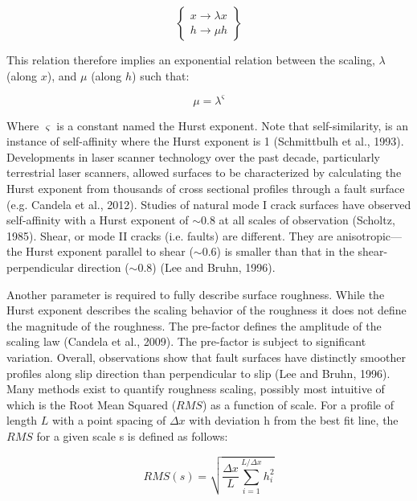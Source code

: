 \documentclass[12pt,a4paper]{article}
\begin{document}
\begin{equation}
\left\lbrace
  \begin{matrix}
   	x \rightarrow \lambda x \\
    h \rightarrow \mu h
  \end{matrix}
\right\rbrace
\end{equation}


This relation therefore implies an exponential relation between the scaling, $\lambda$ (along $x$), and $\mu$ (along $h$) such that:

\begin{equation}
\mu = \lambda^\varsigma
\end{equation}

Where $\varsigma$ is a constant named the Hurst exponent. Note that self-similarity, is an instance of self-affinity where the Hurst exponent is 1 (Schmittbulh et al., 1993). Developments in laser scanner technology over the past decade, particularly terrestrial laser scanners, allowed surfaces to be characterized by calculating the Hurst exponent from thousands of cross sectional profiles through a fault surface (e.g. Candela et al., 2012). Studies of natural mode I crack surfaces have observed self-affinity with a Hurst exponent of $\sim$0.8 at all scales of observation (Scholtz, 1985). Shear, or mode II cracks (i.e. faults) are different. They are anisotropic—the Hurst exponent parallel to shear ($\sim$0.6) is smaller than that in the shear-perpendicular direction ($\sim$0.8) (Lee and Bruhn, 1996). 

Another parameter is required to fully describe surface roughness. While the Hurst exponent describes the scaling behavior of the roughness it does not define the magnitude of the roughness. The pre-factor defines the amplitude of the scaling law (Candela et al., 2009). The pre-factor is subject to significant variation. Overall, observations show that fault surfaces have distinctly smoother profiles along slip direction than perpendicular to slip (Lee and Bruhn, 1996).
Many methods exist to quantify roughness scaling, possibly most intuitive of which is the Root Mean Squared ($RMS$) as a function of scale. For a profile of length $L$ with a point spacing of $\Delta x$ with deviation h from the best fit line, the $RMS$ for a given scale s is defined as follows:

\begin{equation}
RMS(s)=\sqrt{\dfrac{\Delta x}{L}\sum^{L/{\Delta x}}_{i=1} h^2_i}
\end{equation}
\end{document}
